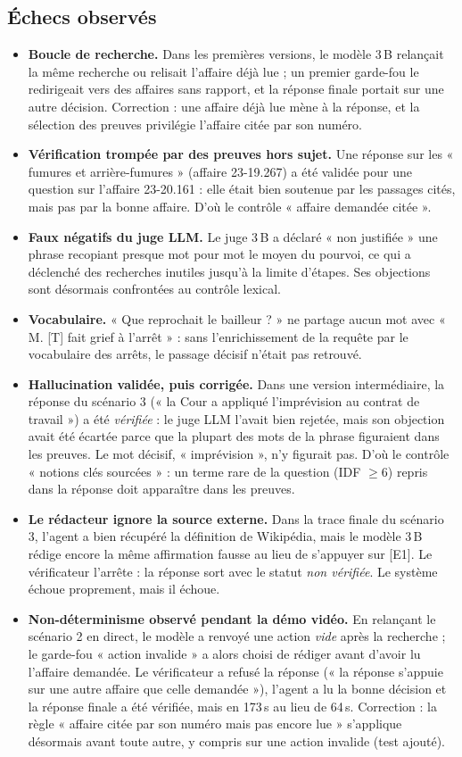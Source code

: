\documentclass[11pt,a4paper]{article}
\begin{document}
\subsection{Échecs observés}
\begin{itemize}
  \item \textbf{Boucle de recherche.} Dans les premières versions, le modèle 3\,B relançait la même recherche ou relisait l'affaire déjà lue ; un premier garde-fou le redirigeait vers des affaires sans rapport, et la réponse finale portait sur une autre décision. Correction : une affaire déjà lue mène à la réponse, et la sélection des preuves privilégie l'affaire citée par son numéro.
  \item \textbf{Vérification trompée par des preuves hors sujet.} Une réponse sur les « fumures et arrière-fumures » (affaire 23-19.267) a été validée pour une question sur l'affaire 23-20.161 : elle était bien soutenue par les passages cités, mais pas par la bonne affaire. D'où le contrôle « affaire demandée citée ».
  \item \textbf{Faux négatifs du juge LLM.} Le juge 3\,B a déclaré « non justifiée » une phrase recopiant presque mot pour mot le moyen du pourvoi, ce qui a déclenché des recherches inutiles jusqu'à la limite d'étapes. Ses objections sont désormais confrontées au contrôle lexical.
  \item \textbf{Vocabulaire.} « Que reprochait le bailleur ? » ne partage aucun mot avec « M. [T] fait grief à l'arrêt » : sans l'enrichissement de la requête par le vocabulaire des arrêts, le passage décisif n'était pas retrouvé.
  \item \textbf{Hallucination validée, puis corrigée.} Dans une version intermédiaire, la réponse du scénario 3 (« la Cour a appliqué l'imprévision au contrat de travail ») a été \emph{vérifiée} : le juge LLM l'avait bien rejetée, mais son objection avait été écartée parce que la plupart des mots de la phrase figuraient dans les preuves. Le mot décisif, « imprévision », n'y figurait pas. D'où le contrôle « notions clés sourcées » : un terme rare de la question (IDF $\geq 6$) repris dans la réponse doit apparaître dans les preuves.
  \item \textbf{Le rédacteur ignore la source externe.} Dans la trace finale du scénario 3, l'agent a bien récupéré la définition de Wikipédia, mais le modèle 3\,B rédige encore la même affirmation fausse au lieu de s'appuyer sur [E1]. Le vérificateur l'arrête : la réponse sort avec le statut \emph{non vérifiée}. Le système échoue proprement, mais il échoue.
  \item \textbf{Non-déterminisme observé pendant la démo vidéo.} En relançant le scénario 2 en direct, le modèle a renvoyé une action \emph{vide} après la recherche ; le garde-fou « action invalide » a alors choisi de rédiger avant d'avoir lu l'affaire demandée. Le vérificateur a refusé la réponse (« la réponse s'appuie sur une autre affaire que celle demandée »), l'agent a lu la bonne décision et la réponse finale a été vérifiée, mais en 173\,s au lieu de 64\,s. Correction : la règle « affaire citée par son numéro mais pas encore lue » s'applique désormais avant toute autre, y compris sur une action invalide (test ajouté).
\end{itemize}
\end{document}
